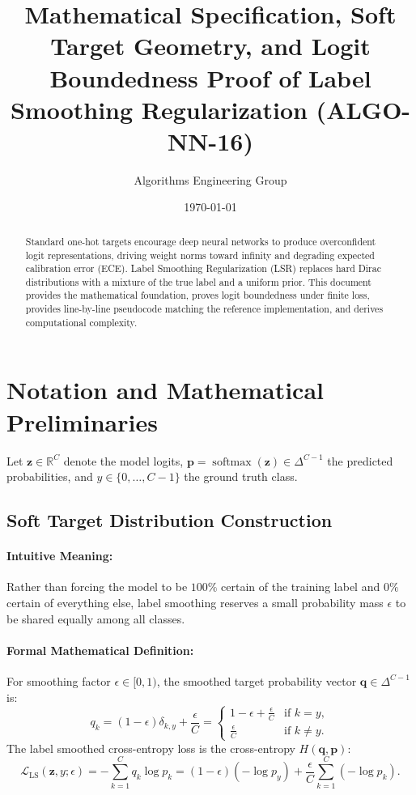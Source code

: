 \documentclass[11pt]{article}
\title{\textbf{Mathematical Specification, Soft Target Geometry, and Logit Boundedness Proof of Label Smoothing Regularization (ALGO-NN-16)}}
\author{Algorithms Engineering Group}
\date{\today}
\begin{document}
\maketitle

\begin{abstract}
Standard one-hot targets encourage deep neural networks to produce overconfident logit representations, driving weight norms toward infinity and degrading expected calibration error (ECE). Label Smoothing Regularization (LSR) replaces hard Dirac distributions with a mixture of the true label and a uniform prior. This document provides the mathematical foundation, proves logit boundedness under finite loss, provides line-by-line pseudocode matching the reference implementation, and derives computational complexity.
\end{abstract}

\section{Notation and Mathematical Preliminaries}
\label{sec:notation}

Let $\mathbf{z} \in \mathbb{R}^C$ denote the model logits, $\mathbf{p} = \operatorname{softmax}(\mathbf{z}) \in \Delta^{C-1}$ the predicted probabilities, and $y \in \{0, \dots, C-1\}$ the ground truth class.

\subsection{Soft Target Distribution Construction}
\paragraph{Intuitive Meaning:} Rather than forcing the model to be $100\%$ certain of the training label and $0\%$ certain of everything else, label smoothing reserves a small probability mass $\epsilon$ to be shared equally among all classes.

\paragraph{Formal Mathematical Definition:}
For smoothing factor $\epsilon \in [0, 1)$, the smoothed target probability vector $\mathbf{q} \in \Delta^{C-1}$ is:
\begin{equation}
\label{eq:smooth_target}
q_k = (1 - \epsilon)\delta_{k, y} + \frac{\epsilon}{C} = \begin{cases} 1 - \epsilon + \frac{\epsilon}{C} & \text{if } k = y, \\ \frac{\epsilon}{C} & \text{if } k \neq y. \end{cases}
\end{equation}
The label smoothed cross-entropy loss is the cross-entropy $H(\mathbf{q}, \mathbf{p})$:
\begin{equation}
\label{eq:smooth_loss}
\mathcal{L}_{\mathrm{LS}}(\mathbf{z}, y; \epsilon) = -\sum_{k=1}^C q_k \log p_k = (1 - \epsilon)(-\log p_y) + \frac{\epsilon}{C} \sum_{k=1}^C (-\log p_k).
\end{equation}
\end{document}
